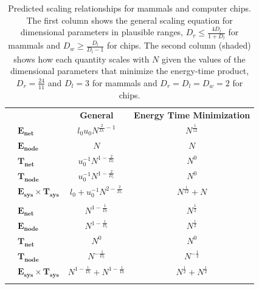 \documentclass[12pt]{article}
\newcommand\T{\rule{0pt}{3ex}}       %
\newcommand\B{\rule[-1.2ex]{0pt}{0pt}} %
\begin{document}
\begin{table}
\centering
\begin{tabular}{l|l|c|c|}
  \multicolumn{2}{l}{} & \multicolumn{1}{c}{\textbf{General}} &
  \multicolumn{1}{c}{\textbf{Energy Time Minimization}} \\
  \hhline{|~|-|-|-|}
  \multirow{5}{*}{\textbf{Mammals}} & $\mathbf{E_{net}}$ &$l_0u_0
  N^{\frac{2}{D_r}-1}$ &\cellcolor{gray!25}
  $N^{\frac{1}{12}}$ \T \\
  \hhline{|~|-|-|-|}
& $\mathbf{E_{node}}$ &  $N$ & \cellcolor{gray!25} $N$ \T \\
  \hhline{|~|-|-|-|}
& $\mathbf{T_{net}}$ & $u_0^{-1}N^{1-\frac{2}{D_r}}$ & \cellcolor{gray!25} $N^0$ \T \\
  \hhline{|~|-|-|-|}
& $\mathbf{T_{node}}$ & $u_0^{-1}N^{1-\frac{2}{D_r}}$ & \cellcolor{gray!25} $N^0$ \T \\  

  \hhline{|~|-|-|-|}
& $\mathbf{E_{sys} \times T_{sys}}$ & $l_0 + u_0^{-1}N^{2-\frac{2}{D_r}}$ &
 \cellcolor{gray!25} $N^{\frac{1}{12}} + N$ \T \\
  \hhline{|~|-|-|-|}
\multicolumn{4}{c}{} \\
  \hhline{|~|-|-|-|}
\multirow{5}{*}{\textbf{Computers}} & $\mathbf{E_{net}}$ & $N^{1-\frac{1}{D_l}}$& \cellcolor{gray!25}
$N^{\frac{1}{2}}$ \T \\
  \hhline{|~|-|-|-|}
& $\mathbf{E_{node}}$&$N^{1-\frac{1}{D_l}}$ &\cellcolor{gray!25}  $N^{\frac{1}{2}}$ \T \\
  \hhline{|~|-|-|-|}
& $\mathbf{T_{net}}$ & $N^{0}$& \cellcolor{gray!25} $N^{0}$ \T \\
  \hhline{|~|-|-|-|}
& $\mathbf{T_{node}}$& $N^{-\frac{1}{D_l}}$& \cellcolor{gray!25} $N^{-\frac{1}{2}}$ \T \\
  \hhline{|~|-|-|-|}
& $\mathbf{E_{sys} \times T_{sys}}$ &$N^{1-\frac{1}{D_l}} + N^{1-\frac{1}{D_l}}$
&\cellcolor{gray!25}  $N^{\frac{1}{2}} + N^{\frac{1}{2}}$ \T \\
  \hhline{|~|-|-|-|}
\end{tabular}
\caption{Predicted scaling relationships for mammals and computer chips. The
  first column shows the general scaling equation for dimensional parameters in
  plausible ranges, $D_r \leq \frac{4D_l}{1+D_l}$ for mammals and $D_w \geq
  \frac{D_l}{D_l -1}$ for chips. The second column
  (shaded) shows how each quantity scales with $N$ given the values of the
  dimensional parameters that minimize the energy-time product, $D_r =
  \frac{24}{11}$ and $D_l=3$ for mammals and $D_r = D_l = D_w =  2$ for chips. 
\label{tab:Predictions}}
\end{table}
\end{document}
